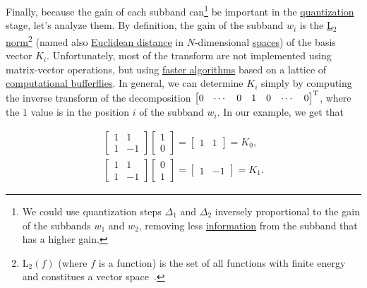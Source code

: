 Finally, because the gain of each subband can\footnote{We could use
  quantization steps $\Delta_1$ and $\Delta_2$ inversely proportional
  to the gain of the subbands $w_1$ and $w_2$, removing less
  \href{https://en.wikipedia.org/wiki/Information}{information} from
  the subband that has a higher gain.} be important in the
\href{https://en.wikipedia.org/wiki/Quantization_(signal_processing)}{quantization}
stage, let's analyze them. By definition, the gain of the subband
$w_i$ is the \href{https://en.wikipedia.org/wiki/Lp_space}{L$_2$
  norm}\footnote{L$_2(f)$ (where $f$ is a function) is the set of all
  functions with finite energy and constitues a vector
  space~\cite{sayood2017introduction}.}  (named also
\href{https://en.wikipedia.org/wiki/Euclidean_distance}{Euclidean
  distance} in $N$-dimensional
\href{https://en.wikipedia.org/wiki/Vector_space}{spaces}) of the
basis vector $K_i$. Unfortunately, most of the transform are not
implemented using matrix-vector operations, but using
\href{https://en.wikipedia.org/wiki/Fast_Fourier_transform}{faster
  algorithms} based on a lattice of
\href{https://en.wikipedia.org/wiki/Butterfly_diagram}{computational
  bufferflies}. In general, we can determine $K_i$ simply by computing
the inverse transform of the decomposition
$\begin{bmatrix} 0 & \cdots & 0 & 1 & 0 & \cdots &
  0 \end{bmatrix}^{\text T}$, where the $1$ value is in the position
$i$ of the subband $w_i$. In our example, we get that

\begin{equation}
  \begin{array}{l}
    \begin{bmatrix}
      1 & 1 \\
      1 & -1
    \end{bmatrix}
    \begin{bmatrix}
      1 \\
      0
    \end{bmatrix}
    =
    \begin{bmatrix}
      1 & 1
    \end{bmatrix} = K_0,
    \\
    \begin{bmatrix}
      1 & 1 \\
      1 & -1
    \end{bmatrix}
    \begin{bmatrix}
      0 \\
      1
    \end{bmatrix}
    =
    \begin{bmatrix}
      1 & -1
    \end{bmatrix} = K_1.
  \end{array}
\end{equation}

